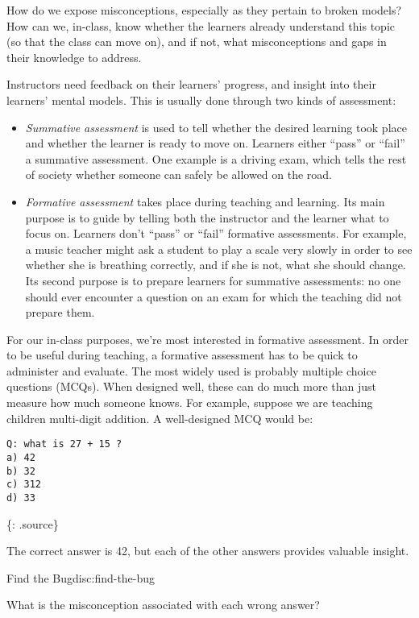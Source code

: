 How do we expose misconceptions, especially as they pertain to broken
models? How can we, in-class, know whether the learners already
understand this topic (so that the class can move on), and if not, what
misconceptions and gaps in their knowledge to address.

Instructors need feedback on their learners' progress, and insight into
their learners' mental models. This is usually done through two kinds of
assessment:

\begin{itemize}
\item
  \emph{Summative assessment} is used to tell whether the desired
  learning took place and whether the learner is ready to move on.
  Learners either ``pass'' or ``fail'' a summative assessment. One
  example is a driving exam, which tells the rest of society whether
  someone can safely be allowed on the road.
\item
  \emph{Formative assessment} takes place during teaching and learning.
  Its main purpose is to guide by telling both the instructor and the
  learner what to focus on. Learners don't ``pass'' or ``fail''
  formative assessments. For example, a music teacher might ask a
  student to play a scale very slowly in order to see whether she is
  breathing correctly, and if she is not, what she should change. Its
  second purpose is to prepare learners for summative assessments: no
  one should ever encounter a question on an exam for which the teaching
  did not prepare them.
\end{itemize}

For our in-class purposes, we're most interested in formative
assessment. In order to be useful during teaching, a formative
assessment has to be quick to administer and evaluate. The most widely
used is probably multiple choice questions (MCQs). When designed well,
these can do much more than just measure how much someone knows. For
example, suppose we are teaching children multi-digit addition. A
well-designed MCQ would be:

\begin{verbatim}
Q: what is 27 + 15 ?
a) 42
b) 32
c) 312
d) 33
\end{verbatim}

\{: .source\}

The correct answer is 42, but each of the other answers provides
valuable insight.

\begin{discussion}{Find the Bug}{disc:find-the-bug}

What is the misconception associated with each wrong answer?
\end{discussion}

